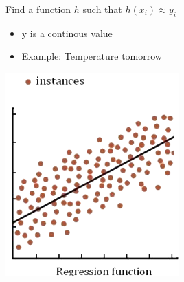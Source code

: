 \documentclass[
../../EiKI_Summary.tex,
]
{subfiles}
\begin{document}
 Find a function $h$ such that $h(x_i) \approx y_i$

\begin{minipage}
    [t]{0.5\textwidth}
    \begin{defbox}
        \begin{itemize}
            \item y is a continous value
            \item Example: Temperature tomorrow
        \end{itemize}

        \begin{center}
            \includegraphics[width=0.5\textwidth]{Pics/11/RegressionFunction.png}
        \end{center}
    \end{defbox}
\end{minipage}
\end{document}
